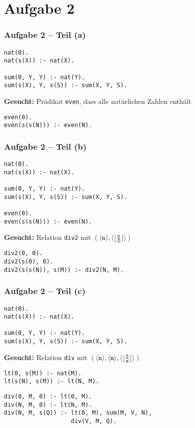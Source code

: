 \documentclass{beamer}
\newcommand{\num}[1]{\ensuremath{\langle #1 \rangle}}
\begin{document}
\section{Aufgabe 2}

\begin{frame}[fragile] \frametitle{Aufgabe 2 -- Teil (a)}
	\begin{lstlisting}
nat(0).
nat(s(X)) :- nat(X).

sum(0, Y, Y) :- nat(Y).
sum(s(X), Y, s(S)) :- sum(X, Y, S).
	\end{lstlisting}
	
	\textbf{Gesucht:} Prädikat \texttt{even}, dass alle natürlichen Zahlen enthält
	
	\pause
	
	\begin{lstlisting}[firstnumber=7]
even(0).
even(s(s(N))) :- even(N).
	\end{lstlisting}
\end{frame}

\begin{frame}[fragile] \frametitle{Aufgabe 2 -- Teil (b)}
	\begin{lstlisting}
nat(0).
nat(s(X)) :- nat(X).

sum(0, Y, Y) :- nat(Y).
sum(s(X), Y, s(S)) :- sum(X, Y, S).

even(0).
even(s(s(N))) :- even(N).
	\end{lstlisting}
	
	\textbf{Gesucht:} Relation \texttt{div2} mit $(\num{\texttt{n}} , \num{\lfloor \frac{\texttt{n}}{\texttt{2}} \rfloor})$
	
	\pause
	
	\begin{lstlisting}[firstnumber=10]
div2(0, 0).
div2(s(0), 0).
div2(s(s(N)), s(M)) :- div2(N, M).
	\end{lstlisting}
\end{frame}

\begin{frame}[fragile] \frametitle{Aufgabe 2 -- Teil (c)}
	\begin{lstlisting}
nat(0).
nat(s(X)) :- nat(X).

sum(0, Y, Y) :- nat(Y).
sum(s(X), Y, s(S)) :- sum(X, Y, S).
	\end{lstlisting}
	
	\textbf{Gesucht:} Relation \texttt{div} mit $(\num{\texttt{n}} , \num{\texttt{m}} , \num{\lfloor \frac{\texttt{n}}{\texttt{m}} \rfloor})$
	
	\pause
	
	\begin{lstlisting}[firstnumber=14]
lt(0, s(M)) :- nat(M).
lt(s(N), s(M)) :- lt(N, M).
	\end{lstlisting}
	
	\pause
	
	\begin{lstlisting}[firstnumber=17]
div(0, M, 0) :- lt(0, M).
div(N, M, 0) :- lt(N, M).
div(N, M, s(Q)) :- lt(0, M), sum(M, V, N), 
                   div(V, M, Q).
	\end{lstlisting}
\end{frame}
\end{document}
